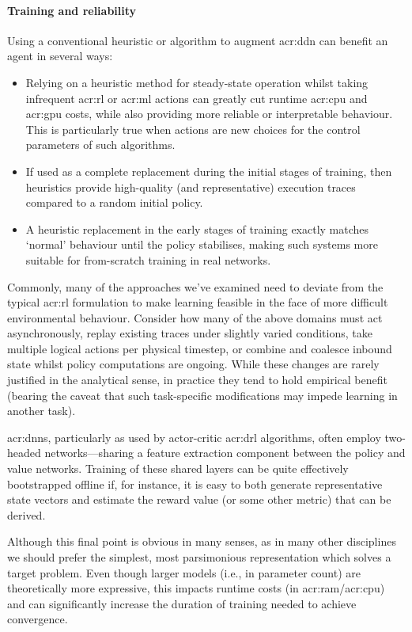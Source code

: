 \paragraph{Training and reliability}
Using a conventional heuristic or algorithm to augment \gls{acr:ddn} can benefit an agent in several ways:
\begin{itemize}
	\item Relying on a heuristic method for steady-state operation whilst taking infrequent \gls{acr:rl} or \gls{acr:ml} actions can greatly cut runtime \gls{acr:cpu} and \gls{acr:gpu} costs, while also providing more reliable or interpretable behaviour. This is particularly true when actions are new choices for the control parameters of such algorithms.
	\item If used as a complete replacement during the initial stages of training, then heuristics provide high-quality (and representative) execution traces compared to a random initial policy.
	\item A heuristic replacement in the early stages of training exactly matches `normal' behaviour until the policy stabilises, making such systems more suitable for from-scratch training in real networks.
\end{itemize}

Commonly, many of the approaches we've examined need to deviate from the typical \gls{acr:rl} formulation to make learning feasible in the face of more difficult environmental behaviour.
Consider how many of the above domains must act asynchronously, replay existing traces under slightly varied conditions, take multiple logical actions per physical timestep, or combine and coalesce inbound state whilst policy computations are ongoing.
While these changes are rarely justified in the analytical sense, in practice they tend to hold empirical benefit (bearing the caveat that such task-specific modifications may impede learning in another task).


\glspl{acr:dnn}, particularly as used by actor-critic \gls{acr:drl} algorithms, often employ two-headed networks---sharing a feature extraction component between the policy and value networks.
Training of these shared layers can be quite effectively bootstrapped offline if, for instance, it is easy to both generate representative state vectors and estimate the reward value (or some other metric) that can be derived.

Although this final point is obvious in many senses, as in many other disciplines we should prefer the simplest, most parsimonious representation which solves a target problem.
Even though larger models (i.e., in parameter count) are theoretically more expressive, this impacts runtime costs (in \gls{acr:ram}/\gls{acr:cpu}) and can significantly increase the duration of training needed to achieve convergence.
